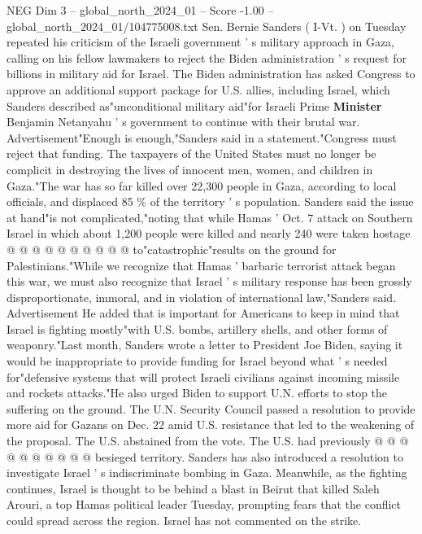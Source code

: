 \begin{textsample}{NEG Dim 3 – global\_north\_2024\_01 – Score -1.00 – global\_north\_2024\_01/104775008.txt}  \label{ex:f3_neg_216}
Sen.
Bernie Sanders ( I-Vt. ) on Tuesday repeated his criticism of the Israeli government ' s military approach in Gaza, calling on his fellow lawmakers to reject the Biden administration ' s request for billions in military aid for Israel.
The Biden administration has asked Congress to approve an additional support package for U.S. allies, including Israel, which Sanders described as"unconditional military aid"for Israeli Prime \textbf{Minister} Benjamin Netanyahu ' s government to continue with their brutal war.
Advertisement"Enough is enough,"Sanders said in a statement."Congress must reject that funding.
The taxpayers of the United States must no longer be complicit in destroying the lives of innocent men, women, and children in Gaza."The war has so far killed over 22,300 people in Gaza, according to local officials, and displaced 85 \% of the territory ' s population.
Sanders said the issue at hand"is not complicated,"noting that while Hamas ' Oct. 7 attack on Southern Israel in which about 1,200 people were killed and nearly 240 were taken hostage @ @ @ @ @ @ @ @ @ @ to"catastrophic"results on the ground for Palestinians."While we recognize that Hamas ' barbaric terrorist attack began this war, we must also recognize that Israel ' s military response has been grossly disproportionate, immoral, and in violation of international law,"Sanders said.
Advertisement He added that is important for Americans to keep in mind that Israel is fighting mostly"with U.S. bombs, artillery shells, and other forms of weaponry."Last month, Sanders wrote a letter to President Joe Biden, saying it would be inappropriate to provide funding for Israel beyond what ' s needed for"defensive systems that will protect Israeli civilians against incoming missile and rockets attacks."He also urged Biden to support U.N. efforts to stop the suffering on the ground.
The U.N.
Security Council passed a resolution to provide more aid for Gazans on Dec. 22 amid U.S. resistance that led to the weakening of the proposal.
The U.S. abstained from the vote.
The U.S. had previously @ @ @ @ @ @ @ @ @ @ besieged territory.
Sanders has also introduced a resolution to investigate Israel ' s indiscriminate bombing in Gaza.
Meanwhile, as the fighting continues, Israel is thought to be behind a blast in Beirut that killed Saleh Arouri, a top Hamas political leader Tuesday, prompting fears that the conflict could spread across the region.
Israel has not commented on the strike.

\end{textsample}

